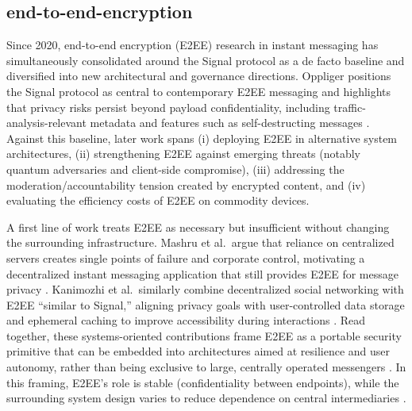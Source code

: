 \subsection{end-to-end-encryption}

Since 2020, end-to-end encryption (E2EE) research in instant messaging has simultaneously consolidated around the Signal protocol as a de facto baseline and diversified into new architectural and governance directions. Oppliger positions the Signal protocol as central to contemporary E2EE messaging and highlights that privacy risks persist beyond payload confidentiality, including traffic-analysis-relevant metadata and features such as self-destructing messages \cite{oppliger2020}. Against this baseline, later work spans (i) deploying E2EE in alternative system architectures, (ii) strengthening E2EE against emerging threats (notably quantum adversaries and client-side compromise), (iii) addressing the moderation/accountability tension created by encrypted content, and (iv) evaluating the efficiency costs of E2EE on commodity devices.

A first line of work treats E2EE as necessary but insufficient without changing the surrounding infrastructure. Mashru et al.\ argue that reliance on centralized servers creates single points of failure and corporate control, motivating a decentralized instant messaging application that still provides E2EE for message privacy \cite{mashru2023}. Kanimozhi et al.\ similarly combine decentralized social networking with E2EE “similar to Signal,” aligning privacy goals with user-controlled data storage and ephemeral caching to improve accessibility during interactions \cite{kanimozhi2025}. Read together, these systems-oriented contributions frame E2EE as a portable security primitive that can be embedded into architectures aimed at resilience and user autonomy, rather than being exclusive to large, centrally operated messengers \cite{mashru2023,kanimozhi2025}. In this framing, E2EE’s role is stable (confidentiality between endpoints), while the surrounding system design varies to reduce dependence on central intermediaries \cite{mashru2023,kanimozhi2025}.

